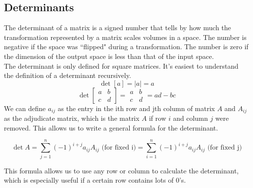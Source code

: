 \subsection{Determinants}
\noindent
The determinant of a matrix is a signed number that tells by how much the transformation represented by a matrix scales volumes in a space.
The number is negative if the space was ``flipped" during a transformation.
The number is zero if the dimension of the output space is less than that of the input space.\\

\noindent
The determinant is only defined for square matrices. It's easiest to understand the definition of a determinant recursively.
\begin{equation*}
	\det{\left[ a \right]} = \lvert a \rvert = a
\end{equation*}
\begin{equation*}
	\det{\left[
		\begin{array}{cc}
			a & b \\
			c & d
		\end{array}
	\right]} = \begin{array}{|cc|}
		a & b \\
		c & d
	\end{array} = ad - bc
\end{equation*}
We can define $a_{ij}$ as the entry in the ith row and jth column of matrix $A$ and $A_{ij}$ as the adjudicate matrix, which is the matrix $A$ if row $i$ and column $j$ were removed. This allows us to write a general formula for the determinant.
\begin{definition}
	\begin{equation*}
		\det{A} = \sum_{j=1}^{n}{\left(-1\right)^{i+j}a_{ij}A_{ij}} \text{ (for fixed i)} = \sum_{i=1}^{n}{\left(-1\right)^{i+j}a_{ij}A_{ij}} \text{ (for fixed j)}
	\end{equation*}
\end{definition}
\noindent
This formula allows us to use any row or column to calculate the determinant, which is especially useful if a certain row contains lots of 0's.\\

